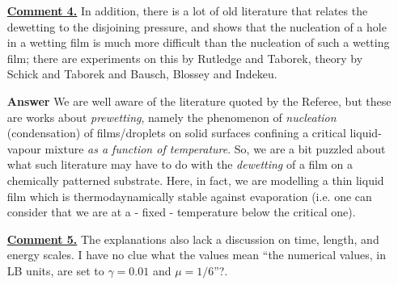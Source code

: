 \documentclass[12pt,english]{article}
\begin{document}
\begin{itemize}
{}

\item[ \textbf{\underline{Comment 4.}}]
{ 
In addition, there is a lot of old literature that relates the dewetting to the disjoining pressure, and shows that the nucleation of a hole in a wetting film is much more difficult than the nucleation of such a wetting film; there are experiments on this by Rutledge and Taborek, theory by Schick and Taborek and Bausch, Blossey and Indekeu.
}

\item[ \textbf{{Answer}}]
{
We are well aware of the literature quoted by the Referee, but these are works 
about {\it prewetting}, namely the phenomenon of {\it nucleation} (condensation)
of films/droplets on solid surfaces confining a critical liquid-vapour mixture
{\it as a function of temperature}. So, we are a bit puzzled about what such literature may have to do with the {\it dewetting} of a film on a chemically patterned substrate. Here, in fact, we are modelling a thin liquid film which is 
thermodaynamically stable against evaporation (i.e. one can consider that 
we are at a - fixed - temperature below the critical one).
}

\item[ \textbf{\underline{Comment 5.}}]
{ 
The explanations also lack a discussion on time, length, and energy scales. 
I have no clue what the values mean ``the numerical values, in LB units, are set to $\gamma= 0.01$ and $\mu = 1/6$''?. 
}


\end{itemize}
\end{document}
